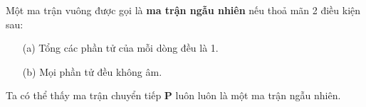 \begin{defivn}
    Một ma trận vuông được gọi là \textbf{ma trận ngẫu nhiên} nếu thoả mãn 2 điều kiện sau:
    \begin{itemize}
        \item[(a)] Tổng các phần tử của mỗi dòng đều là 1.
        \item[(b)] Mọi phần tử đều không âm.
    \end{itemize}

\noindent Ta có thể thấy ma trận chuyển tiếp $\mathbf{P}$ luôn luôn là một ma trận ngẫu nhiên.
\end{defivn}


